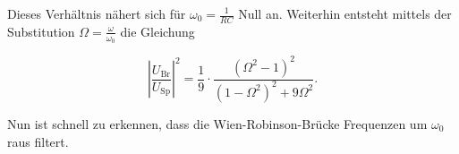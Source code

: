            \noindent Dieses Verhältnis nähert sich für $\omega_0 = \frac{1}{RC}$ Null an. Weiterhin entsteht mittels der 
            Substitution $\Omega = \frac{\omega}{\omega_0}$ die Gleichung

            \begin{equation}
                \left| \frac{U_{\text{Br}}}{U_{\text{Sp}}} \right|^2 = \frac{1}{9} \cdot 
                \frac{\left(\Omega^2 - 1\right)^2}{\left(1 - \Omega^2\right)^2 + 9 \Omega^2}.
            \end{equation}

            \noindent Nun ist schnell zu erkennen, dass die Wien-Robinson-Brücke Frequenzen um $\omega_0$ raus filtert.







